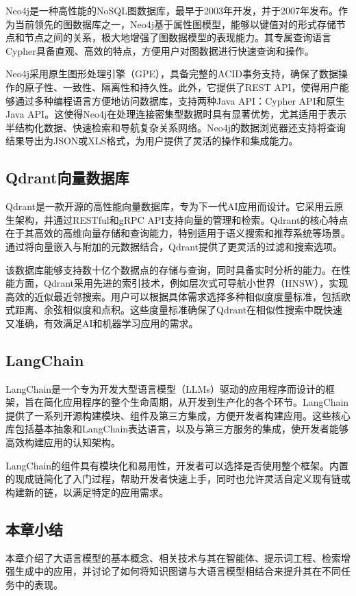 Neo4j是一种高性能的NoSQL图数据库，最早于2003年开发，并于2007年发布。作为当前领先的图数据库之一，Neo4j基于属性图模型，能够以键值对的形式存储节点和节点之间的关系，极大地增强了图数据模型的表现能力。其专属查询语言Cypher具备直观、高效的特点，方便用户对图数据进行快速查询和操作。

Neo4j采用原生图形处理引擎（GPE），具备完整的ACID事务支持，确保了数据操作的原子性、一致性、隔离性和持久性。此外，它提供了REST API，使得用户能够通过多种编程语言方便地访问数据库，支持两种Java API：Cypher API和原生Java API。这使得Neo4j在处理连接密集型数据时具有显著优势，尤其适用于表示半结构化数据、快速检索和导航复杂关系网络。Neo4j的数据浏览器还支持将查询结果导出为JSON或XLS格式，为用户提供了灵活的操作和集成能力。

\subsection{Qdrant向量数据库}

Qdrant是一款开源的高性能向量数据库，专为下一代AI应用而设计。它采用云原生架构，并通过RESTful和gRPC API支持向量的管理和检索。Qdrant的核心特点在于其高效的高维向量存储和查询能力，特别适用于语义搜索和推荐系统等场景。通过将向量嵌入与附加的元数据结合，Qdrant提供了更灵活的过滤和搜索选项。

该数据库能够支持数十亿个数据点的存储与查询，同时具备实时分析的能力。在性能方面，Qdrant采用先进的索引技术，例如层次式可导航小世界（HNSW），实现高效的近似最近邻搜索。用户可以根据具体需求选择多种相似度度量标准，包括欧式距离、余弦相似度和点积。这些度量标准确保了Qdrant在相似性搜索中既快速又准确，有效满足AI和机器学习应用的需求。

\subsection{LangChain}

LangChain是一个专为开发大型语言模型（LLMs）驱动的应用程序而设计的框架，旨在简化应用程序的整个生命周期，从开发到生产化的各个环节。LangChain提供了一系列开源构建模块、组件及第三方集成，方便开发者构建应用。这些核心库包括基本抽象和LangChain表达语言，以及与第三方服务的集成，使开发者能够高效构建应用的认知架构。

LangChain的组件具有模块化和易用性，开发者可以选择是否使用整个框架。内置的现成链简化了入门过程，帮助开发者快速上手，同时也允许灵活自定义现有链或构建新的链，以满足特定的应用需求。

\subsection{本章小结}
本章介绍了大语言模型的基本概念、相关技术与其在智能体、提示词工程、检索增强生成中的应用，并讨论了如何将知识图谱与大语言模型相结合来提升其在不同任务中的表现。
